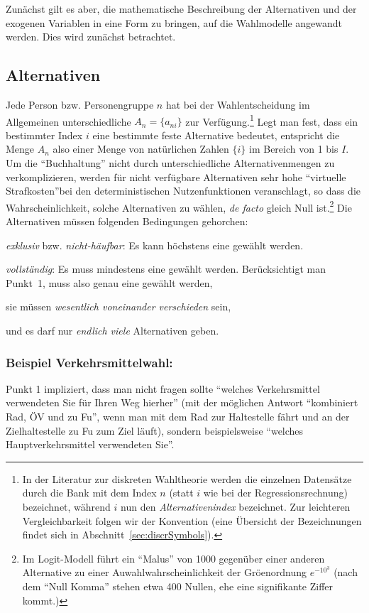 Zun\"achst gilt es aber, die mathematische Beschreibung der
Alternativen und der exogenen Variablen 
in eine Form zu bringen, auf die Wahlmodelle angewandt
werden. Dies wird zun\"achst betrachtet.

\subsection{\label{sec:discrAltern}Alternativen}

Jede Person bzw. Personengruppe $n$ hat bei der Wahlentscheidung im Allgemeinen
unterschiedliche  $A_n=\{a_{ni}\}$ zur
Verf\"ugung.\footnote{In der Literatur zur diskreten Wahltheorie
  werden die einzelnen Datens\"atze durch die Bank mit dem Index $n$
  (statt $i$ wie bei der Regressionsrechnung) bezeichnet, w\"ahrend
  $i$ nun den \emph{Alternativenindex} bezeichnet. Zur
  leichteren Vergleichbarkeit folgen wir der Konvention (eine
  \"Ubersicht der Bezeichnungen findet sich in
  Abschnitt~\ref{sec:discrSymbols}).}
 Legt man fest, dass ein bestimmter Index $i$ eine
bestimmte feste Alternative bedeutet, entspricht die Menge $A_n$ also
einer Menge von nat\"urlichen Zahlen $\{i\}$ im Bereich von 1 bis
$I$. Um die ``Buchhaltung'' nicht durch unterschiedliche Alternativenmengen 
zu verkomplizieren, werden f\"ur nicht verf\"ugbare Alternativen 
sehr hohe  ``virtuelle Strafkosten''bei den deterministischen
Nutzenfunktionen veranschlagt, so dass die Wahrscheinlichkeit, solche
Alternativen zu w\"ahlen, 
\textit{de facto} gleich Null ist.\footnote{Im Logit-Modell
f\"uhrt ein ``Malus'' von 1000 gegen\"uber einer anderen Alternative 
zu einer Auwahlwahrscheinlichkeit der Gr\"o\3enordnung 
$e^{-10^3}$ (nach dem ``Null Komma'' stehen etwa 400 Nullen, ehe
eine signifikante Ziffer kommt.)}
Die Alternativen m\"ussen folgenden Bedingungen gehorchen:
\benum
\item \emph{exklusiv} bzw. \emph{nicht-h\"aufbar}: Es kann h\"ochstens
  eine gew\"ahlt werden.
\item \emph{vollst\"andig}: Es muss mindestens
  eine gew\"ahlt werden. Ber\"ucksichtigt man Punkt~1,  muss also
  genau eine gew\"ahlt werden,
\item sie m\"ussen \emph{wesentlich voneinander verschieden} sein,
\item und es darf nur \emph{endlich viele} Alternativen geben.
\eenum

\subsubsection*{Beispiel Verkehrsmittelwahl:}
Punkt 1 impliziert, dass man nicht fragen sollte ``welches
Verkehrsmittel verwendeten Sie f\"ur Ihren Weg hierher'' (mit der
m\"oglichen Antwort ``kombiniert Rad, 
\"OV und zu Fu\3'', wenn man mit dem Rad zur Haltestelle f\"ahrt und
an der Zielhaltestelle zu Fu\3 zum Ziel l\"auft), sondern beispielsweise
``welches Hauptverkehrsmittel verwendeten Sie''.

